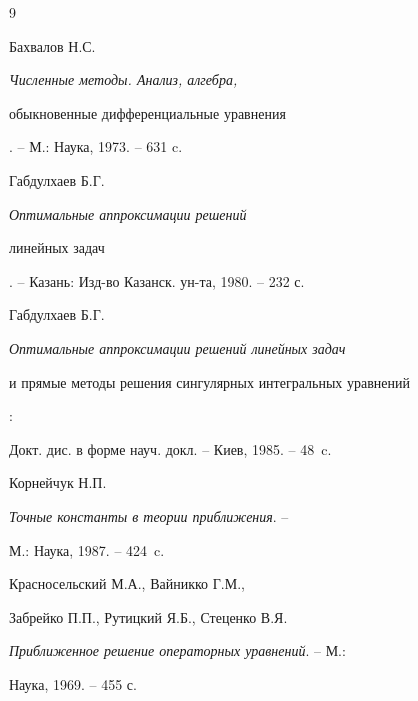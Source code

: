 \begin{thebibliography}{9}







Бахвалов Н.С. {\em Численные методы. Анализ, алгебра,


обыкновенные дифференциальные уравнения}. -- М.: Наука, 1973. -- 631 c.




Габдулхаев Б.Г. {\em Оптимальные аппроксимации решений


линейных задач}. -- Казань: Изд-во Казанск. ун-та, 1980. -- 232 с.




Габдулхаев Б.Г. {\em Оптимальные аппроксимации решений линейных задач 


и прямые методы решения сингулярных интегральных уравнений}:


Докт. дис. в форме науч. докл. -- Киев, 1985. -- 48~c.




Корнейчук  Н.П.


{\em Точные константы в теории приближения}. --


М.: Наука, 1987. -- 424~c.




Красносельский М.А., Вайникко Г.М.,


Забрейко П.П., Рутицкий Я.Б., Стеценко В.Я.


{\em Приближенное решение операторных уравнений}. -- М.:


Наука, 1969. -- 455 с.





\end{thebibliography}





\vskip 0.5cm












\label{end}





